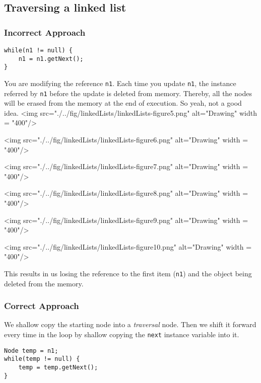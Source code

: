 \subsection{Traversing a linked list}

\subsubsection{Incorrect Approach}

\begin{lstlisting}
while(n1 != null) {
	n1 = n1.getNext();
}
\end{lstlisting}

You are modifying the reference \texttt{n1}. Each time you update \texttt{n1}, the instance referred by \texttt{n1} before the update is deleted from memory. Thereby, all the nodes will be erased from the memory at the end of execution. So yeah, not a good idea.
\vskip 0.5cm
<img src="./../fig/linkedLists/linkedLists-figure5.png" alt="Drawing" width = "400"/>
\vskip 0.3cm

<img src="./../fig/linkedLists/linkedLists-figure6.png" alt="Drawing" width = "400"/>
\vskip 0.3cm


<img src="./../fig/linkedLists/linkedLists-figure7.png" alt="Drawing" width = "400"/>
\vskip 0.3cm

<img src="./../fig/linkedLists/linkedLists-figure8.png" alt="Drawing" width = "400"/>
\vskip 0.3cm

<img src="./../fig/linkedLists/linkedLists-figure9.png" alt="Drawing" width = "400"/>
\vskip 0.3cm

<img src="./../fig/linkedLists/linkedLists-figure10.png" alt="Drawing" width = "400"/>
\vskip 0.5cm

This results in us losing the reference to the first item (\texttt{n1}) and the object being deleted from the memory.
\newpage

\subsubsection{Correct Approach}

We shallow copy the starting node into a \textit{traversal} node. Then we shift it forward every time in the loop by shallow copying the \texttt{next} instance variable into it. 

\begin{lstlisting}
Node temp = n1;
while(temp != null) {
	temp = temp.getNext();
}
\end{lstlisting}

